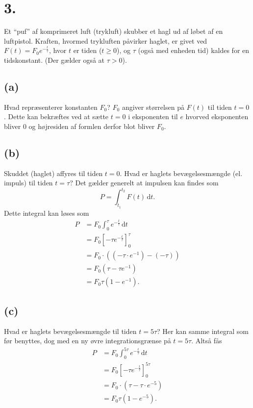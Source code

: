 \documentclass[12pt]{article}
\theoremstyle{definition}
\begin{document}
\section*{3.}
Et ``puf'' af komprimeret luft (trykluft) skubber et hagl ud af løbet af en luftpistol. Kraften, hvormed trykluften påvirker haglet, er givet ved $F(t) = F_0 e^{-\frac{t}{\tau}}$, hvor $t$ er tiden ($t \geq 0$), og $\tau$ (også med enheden tid) kaldes for en tidskonstant. (Der gælder også at $\tau > 0$).

\subsection*{(a)}
Hvad repræsenterer konstanten $F_0$?
\bigbreak
$F_0$ angiver størrelsen på $F(t)$ til tiden $t = 0$. Dette kan bekræftes ved at sætte $t = 0$ i eksponenten til $e$ hvorved eksponenten bliver 0 og højresiden af formlen derfor blot bliver $F_0$. 

\subsection*{(b)}
Skuddet (haglet) affyres til tiden $t = 0$. Hvad er haglets bevægelsesmængde (el. impuls) til tiden $t = \tau$?
\bigbreak
Det gælder generelt at impulsen kan findes som
\[ 
P = \int_{t_1}^{t_2} F(t) \, \mathrm{d}t
.\]
Dette integral kan løses som
\begin{align*}
  P &= F_0 \int_{0}^{\tau} e^{-\frac{t}{\tau}} \, \mathrm{d}t  \\
  &= F_0 \left[ -\tau e^{-\frac{t}{\tau}} \right]_{0}^{\tau}\\
  &= F_0 \cdot \left( \left( -\tau \cdot e^{-1} \right) - \left( -\tau \right) \right) \\
  &= F_0 \left( \tau - \tau e^{-1} \right) \\
  &= F_0 \tau \left( 1 - e^{-1} \right)
.\end{align*}


\subsection*{(c)}
Hvad er haglets bevægelsesmængde til tiden $t = 5\tau$?
\bigbreak
Her kan samme integral som før benyttes, dog med en ny øvre integrationsgrænse på $t = 5\tau$. Altså fås
\begin{align*}
  P &= F_0 \int_{0}^{5\tau} e^{-\frac{t}{\tau}} \, \mathrm{d}t  \\
  &= F_0 \left[ -\tau e^{-\frac{t}{\tau}} \right]_{0}^{5\tau} \\
  &= F_0 \cdot \left( \tau -\tau \cdot e^{-5} \right)  \\
  &= F_0 \tau (1-e^{-5})
.\end{align*}
\end{document}
